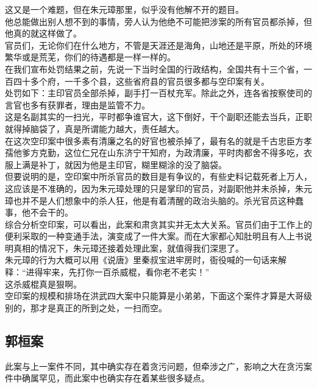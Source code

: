 \begin{multicols}{\theparacolNo}
这又是一个难题，但在朱元璋那里，似乎没有他解不开的题目。\\

他总能做出别人想不到的事情，旁人认为他绝不可能把涉案的所有官员都杀掉，但他真的就这样做了。\\

官员们，无论你们在什么地方，不管是天涯还是海角，山地还是平原，所处的环境繁华或是荒芜，你们的待遇都是一样一样的。\\

在我们宣布处罚结果之前，先说一下当时全国的行政结构，全国共有十三个省，一百四十多个府，一千多个县，这些省府县的官员很多都与空印案有关。\\

处罚如下：主印官员全部杀掉，副手打一百杖充军。除此之外，连各省按察使司的言官也多有获罪者，理由是监管不力。\\

这是名副其实的一扫光，平时都争谁官大，这下倒好，干个副职还能去当兵，正职就得掉脑袋了，真是所谓能力越大，责任越大。\\

在这次空印案中很多素有清廉之名的好官也被杀掉了，最有名的就是千古忠臣方孝孺他爹方克勤，这位仁兄在山东济宁干知府，为政清廉，平时肉都舍不得多吃，衣服上满是补丁，就因为他是主印官，糊里糊涂的没了脑袋。\\

但要说明的是，空印案中所杀官员的数目是有争议的，有些史料记载死者上万人，这应该是不准确的，因为朱元璋处理的只是掌印的官员，对副职他并未杀掉，朱元璋也并不是人们想象中的杀人狂，他是有着清醒的政治头脑的。杀光官员这种蠢事，他不会干的。\\

综合分析空印案，可以看出，此案和肃贪其实并无太大关系。官员们由于工作上的便利采取的一种变通手法，演变成了一件大案。而在大家都心知肚明且有人上书说明真相的情况下，朱元璋还接着处理此案，就值得我们深思了。\\

朱元璋的行为大概可以用《说唐》里秦叔宝进牢房时，衙役喊的一句话来解释：“进得牢来，先打你一百杀威棍，看你老不老实！”\\

这杀威棍真是狠啊。\\

空印案的规模和排场在洪武四大案中只能算是小弟弟，下面这个案件才算是大哥级别的，那才是真正的所到之处，一扫而空。\\

\subsection{郭桓案}
此案与上一案件不同，其中确实存在着贪污问题，但牵涉之广，影响之大在贪污案件中确属罕见，而此案中也确实存在着某些很多疑点。\\


\end{multicols}
